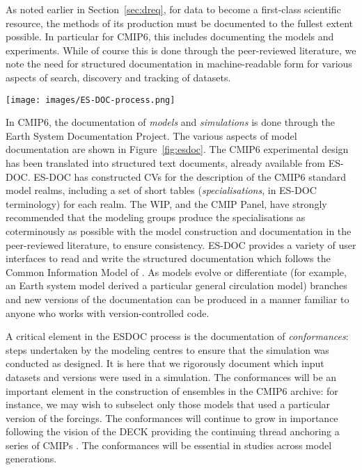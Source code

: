\documentclass[gmd,manuscript]{copernicus}
\newcommand{\bibref}[1] { \cite{ref:#1}}
\newcommand{\figref}[1] {\mbox{Figure   \ref{fig:#1}}}
\newcommand{\secref}[1] {\mbox{Section  \ref{sec:#1}}}
\begin{document}
As noted earlier in \secref{dreq}, for data to become a first-class
scientific resource, the methods of its production must be documented
to the fullest extent possible. In particular for CMIP6, this includes
documenting the models and experiments. While of course this is done
through the peer-reviewed literature, we note the need for structured
documentation in machine-readable form for various aspects of search,
discovery and tracking of datasets.


\begin{figure*}
  \begin{center}
    \texttt{[image: images/ES-DOC-process.png]}
  \end{center}
  \caption{Flowchart of ES-DOC documentation process, delineating
    sequence of events and indicating the parties responsible for
    producing the documentation. Figure courtesy Eric Guilyardi and
    Mark Greenslade.}
  \label{fig:esdoc}
\end{figure*}

In CMIP6, the documentation of \emph{models} and \emph{simulations} is
done through the Earth System Documentation
\citep[\href{https://goo.gl/WNwKD9}{ES-DOC},][]{ref:guilyardietal2013}
Project. The various aspects of model documentation are shown in
\figref{esdoc}. The CMIP6 experimental design has been translated into
structured text documents, already available from ES-DOC. ES-DOC has
constructed CVs for the description of the CMIP6 standard model
realms, including a set of short tables (\emph{specialisations}, in
ES-DOC terminology) for each realm. The WIP, and the CMIP Panel, have
strongly recommended that the modeling groups produce the
specialisations as coterminously as possible with the model
construction and documentation in the peer-reviewed literature, to
ensure consistency. ES-DOC provides a variety of user interfaces to
read and write the structured documentation which follows the Common
Information Model of \bibref{lawrenceetal2012}. As models evolve or
differentiate (for example, an Earth system model derived a particular
general circulation model) branches and new versions of the
documentation can be produced in a manner familiar to anyone who works
with version-controlled code.

A critical element in the ESDOC process is the documentation of
\emph{conformances}: steps undertaken by the modeling centres to
ensure that the simulation was conducted as designed. It is here that
we rigorously document which input datasets and versions \citep[e.g the
forcing datasets, see][]{ref:duracketal2017} were used in a
simulation. The conformances will be an important element in the
construction of ensembles in the CMIP6 archive: for instance, we may
wish to subselect only those models that used a particular version of
the forcings. The conformances will continue to grow in importance
following the vision of the DECK providing the continuing thread
anchoring a series of CMIPs \citep[viz. the well-known Figure~1
of][]{ref:eyringetal2016a}. The conformances will be essential in
studies across model generations.
\end{document}
